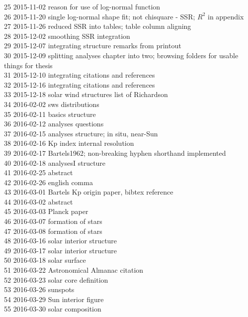 \begin{footnotesize}
25	2015-11-02	reason for use of log-normal function\\
26	2015-11-20	single log-normal shape fit; not chisquare - SSR; $R^2$ in appendix\\
27	2015-11-26	reduced SSR into tables; table column aligning\\
28	2015-12-02	smoothing SSR integration\\
29	2015-12-07	integrating structure remarks from printout\\
30	2015-12-09	splitting analyses chapter into two; browsing folders for usable things for thesis\\
31	2015-12-10	integrating citations and references\\
32	2015-12-16	integrating citations and references\\
33	2015-12-18	solar wind structures list of Richardson\\
34	2016-02-02	sws distributions\\
35	2016-02-11	basics structure\\
36	2016-02-12	analyses questions\\
37	2016-02-15	analyses structure; in situ, near-Sun\\
38	2016-02-16	Kp index internal resolution\\
39	2016-02-17	Bartels1962; non-breaking hyphen shorthand implemented\\
40	2016-02-18	analysesI structure\\
41	2016-02-25	abstract\\
42	2016-02-26	english comma\\
43	2016-03-01	Bartels Kp origin paper, bibtex reference\\
44	2016-03-02	abstract\\
45	2016-03-03	Planck paper\\
46	2016-03-07	formation of stars\\
47	2016-03-08	formation of stars\\
48	2016-03-16	solar interior structure\\
49	2016-03-17	solar interior structure\\
50	2016-03-18	solar surface\\
51	2016-03-22	Astronomical Almanac citation\\
52	2016-03-23	solar core definition\\
53	2016-03-26	sunspots\\
54	2016-03-29	Sun interior figure\\
55	2016-03-30	solar composition\\

\end{footnotesize}
